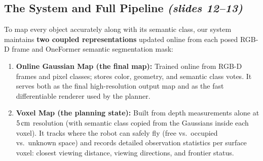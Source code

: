 \documentclass[11pt, a4paper]{article}
\theoremstyle{definition}
\begin{document}
\subsection{The System and Full Pipeline \emph{(slides 12--13)}}

To map every object accurately along with its semantic class, our system maintains \textbf{two coupled representations} updated online from each posed RGB-D frame and OneFormer semantic segmentation mask:
\begin{enumerate}[leftmargin=*]
    \item \textbf{Online Gaussian Map (the final map):} Trained online from RGB-D frames and pixel classes; stores color, geometry, and semantic class votes. It serves both as the final high-resolution output map and as the fast differentiable renderer used by the planner.
    \item \textbf{Voxel Map (the planning state):} Built from depth measurements alone at $5\text{\,cm}$ resolution (with semantic class copied from the Gaussians inside each voxel). It tracks where the robot can safely fly (free vs.\ occupied vs.\ unknown space) and records detailed observation statistics per surface voxel: closest viewing distance, viewing directions, and frontier status.
\end{enumerate}
\end{document}
